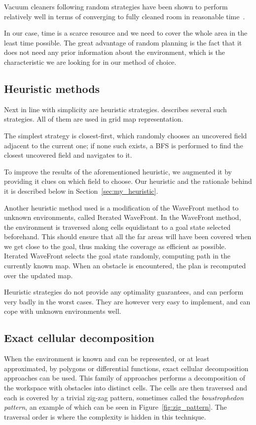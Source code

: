 \documentclass[buriama8_dp.tex]{subfiles}
\begin{document}
Vacuum cleaners following random strategies have been shown to perform relatively well in terms of converging to fully cleaned room in reasonable time~\cite{randomcover}.

In our case, time is a scarce resource and we need to cover the whole area in the least time possible. The great advantage of random planning is the fact that it does not need any prior information about the environment, which is the characteristic we are looking for in our method of choice.

\subsection{Heuristic methods}
\label{subsec:heuritic}
Next in line with simplicity are heuristic strategies. \cite{rt_heuristic_coverage} describes several such strategies. All of them are used in grid map representation.

The simplest strategy is closest-first, which randomly chooses an uncovered field adjacent to the current one; if none such exists, a BFS is performed to find the closest uncovered field and navigates to it.

To improve the results of the aforementioned heuristic, we augmented it by providing it clues on which field to choose. Our heuristic and the rationale behind it is described below in Section~\ref{sec:my_heuristic}.

Another heuristic method used is a modification of the WaveFront method \cite{wavefront} to unknown environments, called Iterated WaveFront. In the WaveFront method, the environment is traversed along cells equidistant to a goal state selected beforehand. This should ensure that all the far areas will have been covered when we get close to the goal, thus making the coverage as efficient as possible. Iterated WaveFront selects the goal state randomly, computing path in the currently known map. When an obstacle is encountered, the plan is recomputed over the updated map.

Heuristic strategies do not provide any optimality guarantees, and can perform very badly in the worst cases. They are however very easy to implement, and can cope with unknown environments well. 

\subsection{Exact cellular decomposition}
\label{subsec:boustrop}
When the environment is known and can be represented, or at least approximated, by polygons or differential functions, exact cellular decomposition approaches can be used. This family of approaches performs a decomposition of the workspace with obstacles into distinct cells. The cells are then traversed and each is covered by a trivial zig-zag pattern, sometimes called the \textit{boustrophedon pattern}, an example of which can be seen in Figure~\ref{fig:zig_pattern}. The traversal order is where the complexity is hidden in this technique.
\end{document}
